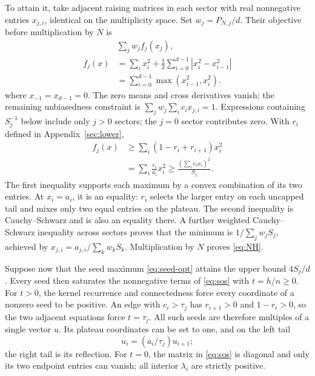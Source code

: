 \documentclass[aps,pra,reprint,superscriptaddress]{revtex4-2}
\theoremstyle{remark}
\begin{document}
To attain it, take adjacent raising matrices in each sector with
real nonnegative entries $x_{j,i}$, identical on the multiplicity
space. Set $w_j=P_{N,j}/d$. Their objective before multiplication
by $N$ is
\begin{equation}
\begin{aligned}
&\sum_jw_j f_j(x_j),\\
f_j(x)&=\sum_i x_i^2+\frac12\sum_{i=0}^{d-1}|x_i^2-x_{i-1}^2|\\
&=\sum_{i=0}^{d-1}\max(x_{i-1}^2,x_i^2).
\end{aligned}
\label{eq:NH-objective}
\end{equation}
where $x_{-1}=x_{d-1}=0$. The zero means and cross derivatives vanish;
the remaining unbiasedness constraint is
$\sum_jw_j\sum_i c_ix_{j,i}=1$.
Expressions containing $S_j^{-1}$ below include only $j>0$ sectors;
the $j=0$ sector contributes zero.
With $r_i$ defined in Appendix~\ref{sec:lower},
\begin{equation}
\begin{aligned}
f_j(x)&\geq\sum_i(1-r_i+r_{i+1})x_i^2\\
&=\sum_i\frac{c_i}{a_i}x_i^2
\geq\frac{(\sum_i c_ix_i)^2}{S_j}.
\end{aligned}
\label{eq:NH-CS}
\end{equation}
The first inequality supports each maximum by a convex combination
of its two entries. At $x_i=a_i$, it is an equality: $r_i$ selects
the larger entry on each uncapped tail and mixes only two equal
entries on the plateau. The second inequality is Cauchy--Schwarz
and is also an equality there. A further weighted
Cauchy--Schwarz inequality across sectors proves that the minimum
is $1/\sum_jw_jS_j$, achieved by
$x_{j,i}=a_{j,i}/\sum_kw_kS_k$. Multiplication by $N$ proves
\eqref{eq:NH}.

Suppose now that the seed maximum \eqref{eq:seed-opt} attains the
upper bound $4S_j/d$. Every seed then saturates the nonnegative
terms of \eqref{eq:sos} with $t=h/n\geq0$.
For $t>0$, the kernel recurrence and connectedness force every
coordinate of a nonzero seed to be positive. An edge with $c_i>
\tau_j$ has $r_{i+1}>0$ and $1-r_i>0$, so the two adjacent
equations force $t=\tau_j$. All such seeds are therefore multiples
of a single vector $u$. Its plateau coordinates can be set to one,
and on the left tail
\begin{equation}
 u_i=(a_i/\tau_j)u_{i+1};
 \label{eq:tail-recursion}
\end{equation}
the right tail is its reflection. For $t=0$, the matrix in
\eqref{eq:sos} is diagonal and only its two endpoint entries can
vanish; all interior $\lambda_i$ are strictly positive.
\end{document}
